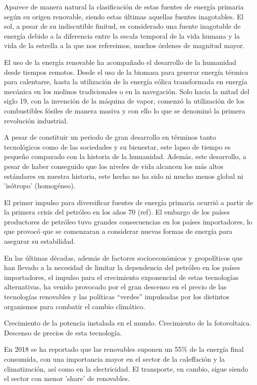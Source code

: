 Aparece de manera natural la clasificación de estas fuentes de energía primaria según su origen renovable, siendo estas últimas aquellas fuentes inagotables. El sol, a pesar de su indiscutible finitud,  es considerado una fuente inagotable de energía debido a la diferencia entre la escala temporal de la vida humana y la vida de la estrella a la que nos refereimos, muchos órdenes de magnitud mayor.

El uso de la energía renovable ha acompañado el desarrollo de la humanidad desde tiempos remotos. Desde el uso de la biomasa para generar energía térmica para calentarse, hasta la utilización de la energía eólica transformada en energía mecánica en los molinos tradicionales o en la navegación. Solo hacia la mitad del siglo 19, con la invención de la máquina de vapor, comenzó la utilización de los combustibles fósiles de manera masiva y con ello lo que se denominó la primera revolución industrial.

A pesar de constituir un periodo de gran desarrollo en términos tanto tecnológicos como de las sociedades y su bienestar, este lapso de tiempo es pequeño comparado con la historia de la humanidad. Además, este desarrollo, a pesar de haber conseguido que los niveles de vida alcancen los más altos estándares en nuestra historia, este hecho no ha sido ni mucho menos global ni 'isótropo' (homogéneo). 

El primer impulso para diversificar fuentes de energía primaria ocurrió a partir de la primera crisis del petróleo en los años 70 (ref). El embargo de los países productores de petróleo tuvo grandes consecuencias en los países importadores, lo que provocó que se comenzaran a considerar nuevas formas de energía para asegurar su estabilidad.

En las últimas décadas, además de factores socioeconómicos y geopolíticos que han llevado a la necesidad de limitar la dependencia del petróleo en los países importadores, el impulso para el crecimiento exponencial de estas tecnologías alternativas, ha venido provocado por el gran descenso en el precio de las tecnologías renovables y las políticas ``verdes'' impulsadas por los distintos organismos para combatir el cambio climático.

Crecimiento de la potencia instalada en el mundo. Crecimiento de la fotovoltaica. Descenso de precios de esta tecnología.

En 2018 se ha reportado que las renovables suponen un 55\% de la energía final consumida, con una importancia mayor en el sector de la caleffación y la climatización, así como en la electricidad. El transporte, en cambio, sigue siendo el sector con menor 'share' de renovables. 

